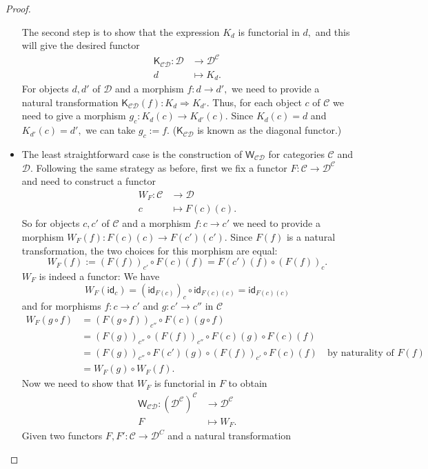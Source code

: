 \documentclass[a4paper]{article}
\theoremstyle{definition}
\theoremstyle{remark}
\newcommand{\C}{\mathcal{C}}
\newcommand{\D}{\mathcal{D}}
\newcommand{\nm}{\mathsf}
\newcommand{\id}{\nm{id}}
\newcommand{\combinator}{\nm}
\newcommand{\constFun}{\combinator{K}}
\newcommand{\dupFun}{\combinator{W}}
\begin{document}
\begin{proof}
\begin{itemize}
    The second step is to show that the expression $K_d$ is functorial in $d,$ and
    this will give the desired functor
    \begin{align*}
      \constFun_{\C\D} : \D &\to     \D^\C\\
                         d  &\mapsto K_d.
    \end{align*}
    For objects $d,d'$ of $\D$ and a morphism $f : d \to d',$ we need to provide a
    natural transformation $\constFun_{\C\D}(f) : K_d \Rightarrow K_{d'}.$
    Thus, for each object $c$ of $\C$ we need to give a morphism
    $g_c : K_d(c) \to K_{d'}(c).$ Since $K_d(c) = d$ and $K_{d'}(c) = d',$ we can
    take $g_c := f.$ ($\constFun_{\C\D}$ is known as the diagonal functor.)
    \item The least straightforward case is the construction of $\dupFun_{\C\D}$ for
    categories $\C$ and $\D.$ Following the same strategy as before, first we fix a
    functor $F : \C \to \D^\C$ and need to construct a functor
    \begin{align*}
      W_F : \C &\to     \D\\
            c  &\mapsto F(c)(c).
    \end{align*}
    So for objects $c,c'$ of $\C$ and a morphism $f : c \to c'$ we need to provide
    a morphism $W_F(f) : F(c)(c) \to F(c')(c').$ Since $F(f)$ is a natural
    transformation, the two choices for this morphism are equal:
    \[W_F(f) := (F(f))_{c'} \circ F(c)(f) = F(c')(f) \circ (F(f))_c.\]
    $W_F$ is indeed a functor: We have
    \[W_F(\id_c) = (\id_{F(c)})_{c} \circ \id_{F(c)(c)} = \id_{F(c)(c)}\]
    and for morphisms $f : c \to c'$ and $g : c' \to c''$ in $\C$
    \begin{align*}
      W_F(g \circ f) &= (F(g \circ f))_{c''} \circ F(c)(g \circ f)\\
                     &= (F(g))_{c''} \circ (F(f))_{c''} \circ F(c)(g) \circ F(c)(f)\\
                     &= (F(g))_{c''} \circ F(c')(g) \circ (F(f))_{c'} \circ F(c)(f) \quad \text{by naturality of $F(f)$}\\
                     &= W_F(g) \circ W_F(f).
    \end{align*}
    Now we need to show that $W_F$ is functorial in $F$ to obtain
    \begin{align*}
      \dupFun_{\C\D} : (\D^\C)^\C &\to     \D^\C\\
                       F          &\mapsto W_F.
    \end{align*}
    Given two functors $F,F' : \C \to \D^C$ and a natural transformation

\end{itemize}
\end{proof}
\end{document}
